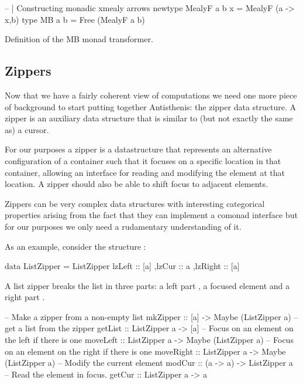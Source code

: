 \begin{code}
\begin{haskellcode}
-- | Constructing monadic xmealy arrows
newtype MealyF a b x = MealyF (a -> x,b)
type MB a b = Free (MealyF a b)
\end{haskellcode}
  \caption{\label{lst:mb_def}Definition of the MB monad transformer.}
\end{code}


\subsection{Zippers}

Now that we have a fairly coherent view of computations we need one
more piece of background to start putting together Antisthenis: the
zipper data structure. A zipper \cite{huetZipper1997} is an auxiliary
data structure that is similar to (but not exactly the same as) a
cursor.

For our purposes a zipper is a datastructure that represents an
alternative configuration of a container such that it focuses on a
specific location in that container, allowing an interface for reading
and modifying the element at that location. A zipper should also be
able to shift focus to adjacent elements.

Zippers can be very complex data structures with interesting
categorical properties arising from the fact that they can implement a
comonad interface \cite{uustaluComonadicFunctionalAttribute2005} but
for our purposes we only need a rudamentary understanding of it.

As an example, consider the structure :

\begin{haskellcode}
data ListZipper =
  ListZipper
  { lzLeft :: [a]
   ,lzCur :: a
   ,lzRight :: [a]
  }
\end{haskellcode}

A list zipper breaks the list in three parts: a left part , a
focused element  and a right part .

\begin{haskellcode}
-- Make a zipper from a non-empty list
mkZipper :: [a] -> Maybe (ListZipper a)
-- get a list from the zipper
getList :: ListZipper a -> [a]
-- Focus on an element on the left if there is one
moveLeft :: ListZipper a -> Maybe (ListZipper a)
-- Focus on an element on the right if there is one
moveRight :: ListZipper a -> Maybe (ListZipper a)
-- Modify the current element
modCur :: (a -> a) -> ListZipper a
-- Read the element in focus.
getCur :: ListZipper a -> a
\end{haskellcode}

